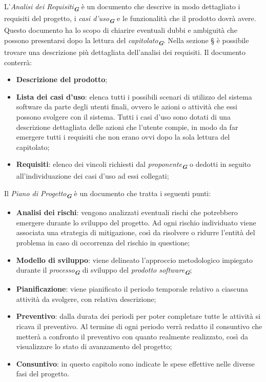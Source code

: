 L'\emph{Analisi dei Requisiti}\textsubscript{\textit{\textbf{G}}} è un documento che descrive in modo dettagliato i requisiti del progetto, i \emph{casi d'uso}\textsubscript{\textit{\textbf{G}}} e le funzionalità che il prodotto dovrà avere. 
Questo documento ha lo scopo di chiarire eventuali dubbi e ambiguità che possono presentarsi dopo la lettura del \emph{capitolato}\textsubscript{\textit{\textbf{G}}}.
Nella sezione \S{} è possibile trovare una descrizione più dettagliata dell'analisi dei requisiti.
Il documento conterrà:
\begin{itemize}
    \item \textbf{Descrizione del prodotto};
    \item \textbf{Lista dei casi d'uso}: elenca tutti i possibili scenari di utilizzo del sistema software
    da parte degli utenti finali, ovvero le azioni o attività che essi possono svolgere con il
    sistema. Tutti i casi d’uso sono dotati di una descrizione dettagliata delle azioni che
    l’utente compie, in modo da far emergere tutti i requisiti che non erano ovvi dopo la
    sola lettura del capitolato;
    \item \textbf{Requisiti}: elenco dei vincoli richiesti dal \emph{proponente}\textsubscript{\textit{\textbf{G}}} o dedotti in seguito all'individuazione dei casi d'uso ad essi collegati;
\end{itemize}

Il \emph{Piano di Progetto}\textsubscript{\textit{\textbf{G}}} è un documento che tratta i seguenti punti:
\begin{itemize}
    \item \textbf{Analisi dei rischi}: vengono analizzati eventuali rischi che potrebbero emergere durante lo sviluppo del progetto. 
    Ad ogni rischio individuato viene associata una strategia di mitigazione, così da risolvere o ridurre l’entità del problema 
    in caso di occorrenza del rischio in questione;
    \item \textbf{Modello di sviluppo}: viene delineato l’approccio metodologico impiegato durante il
    \emph{processo}\textsubscript{\textit{\textbf{G}}} di sviluppo del \emph{prodotto software}\textsubscript{\textit{\textbf{G}}};
    \item \textbf{Pianificazione}: viene pianificato il periodo temporale relativo a ciascuna attività da svolgere, con relativa descrizione;
    \item \textbf{Preventivo}: dalla durata dei periodi per poter completare tutte le attività si ricava il preventivo. 
    Al termine di ogni periodo verrà redatto il consuntivo che metterà a confronto il preventivo con quanto realmente realizzato, 
    così da visualizzare lo stato di avanzamento del progetto;
    \item \textbf{Consuntivo}: in questo capitolo sono indicate le spese effettive nelle diverse fasi del progetto.
\end{itemize}


